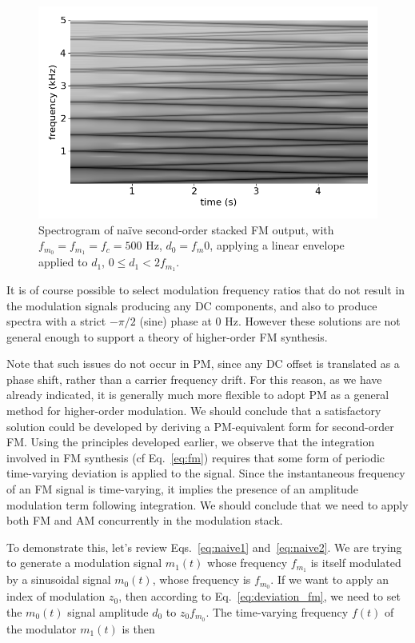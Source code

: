 \documentclass[]{interact}
\begin{document}
\begin{figure}[htp]
\begin{center}
\includegraphics[width=0.9\columnwidth]{naive.png}
\caption{Spectrogram of na\"{i}ve second-order stacked FM output, with $f_{m_0} = f_{m_1} = f_c = 500$ Hz, $d_0 = f_m0$, applying a linear envelope applied to $d_1$, $0 \leq d_1 < 2f_{m_1}$.}
\label{fig:naive1}
\end{center}
\end{figure} 

It is of course possible to select modulation frequency ratios that do not result in the modulation signals producing any DC components, and also to produce spectra with a strict $-\pi/2$ (sine) phase at 0 Hz. However these solutions are not general enough to support a theory of higher-order FM synthesis. 

Note that such issues do not occur in PM, since any DC offset is translated as a phase shift,
rather than a carrier frequency drift. For this reason, as we have already indicated, 
it is generally much more flexible to adopt PM as a general method for higher-order modulation. 
We should conclude that a satisfactory solution could be developed by deriving a PM-equivalent
form for second-order FM. Using the principles developed earlier, we observe that the integration involved in FM synthesis (cf Eq.~\ref{eq:fm}) requires that some form of periodic time-varying deviation is applied to the signal. Since the instantaneous frequency of an FM signal is time-varying, it implies the presence of an amplitude modulation term following integration. We should
conclude that we need to apply both FM and AM concurrently in the modulation stack.

To demonstrate this, let's review Eqs.~\ref{eq:naive1} and~\ref{eq:naive2}. We are trying to generate a modulation signal $m_1(t)$ whose frequency $f_{m_1}$ is itself modulated by a sinusoidal signal $m_0(t)$, whose frequency is $f_{m_0}$. If we want to apply an index of modulation $z_0$, then according to Eq.~\ref{eq:deviation_fm}, we need to set the $m_0(t)$ signal amplitude $d_0$ to $z_0 f_{m_0}$. The time-varying frequency $f(t)$ of the modulator $m_1(t)$ is then 
\end{document}
